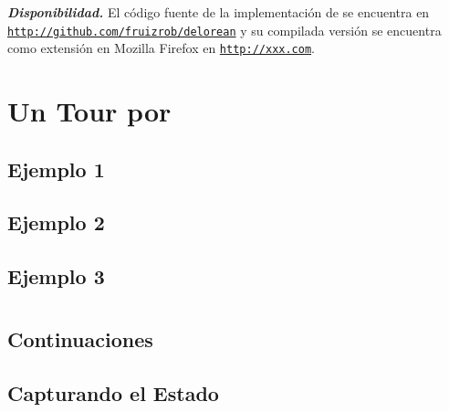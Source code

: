 \documentclass[conference]{IEEEtran}
\begin{document}
{\bf {\em Disponibilidad.}} El c\'odigo fuente de la implementaci\'on de \deloreanjs se encuentra en {\tt \url{http://github.com/fruizrob/delorean}} y su compilada versi\'on se encuentra como extensi\'on en Mozilla Firefox en {\tt \url{http://xxx.com}}. 



\section{Un Tour por \deloreanjs}
\label{sec:tour}


\subsection{Ejemplo 1}
\label{sec:tour1}


\subsection{Ejemplo 2}
\label{sec:tour2}


\subsection{Ejemplo 3}
\label{sec:tour3}


\bigskip

\section{\deloreanjs}
\label{sec:deloreanjs}


\subsection{Continuaciones}
\label{sec:continuaciones}


\subsection{Capturando el Estado}
\label{sec:estados}

\end{document}
